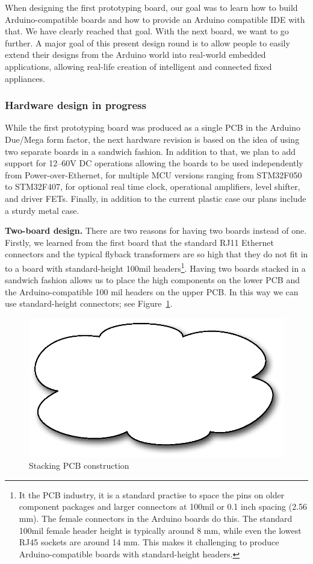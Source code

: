 \documentclass[draft,a4paper]{siamltex}
\begin{document}
When designing the first prototyping board, our goal was to learn how
to build Arduino-compatible boards and how to provide an Arduino
compatible IDE with that.  We have clearly reached that goal.  With
the next board, we want to go further.  A major goal of this present
design round is to allow people to easily extend their designs from
the Arduino world into real-world embedded applications, allowing
real-life creation of intelligent and connected fixed appliances.

\subsubsection{Hardware design in progress}

While the first prototyping board was produced as a single PCB in the
Arduino Due/Mega form factor, the next hardware revision is based on
the idea of using two separate boards in a sandwich fashion.  In
addition to that, we plan to add support for 12--60V DC operations allowing
the boards to be used independently from Power-over-Ethernet, for
multiple MCU versions ranging from STM32F050 to STM32F407, for
optional real time clock, operational amplifiers, level shifter, and
driver FETs.  Finally, in addition to the current plastic case our
plans include a sturdy metal case.

{\bf Two-board design.}
There are two reasons for having two boards instead of one.  Firstly,
we learned from the first board that the standard RJ11 Ethernet
connectors and the typical flyback transformers are so high that they
do not fit in to a board with standard-height 100mil
headers\footnote{It the PCB industry, it is a standard practise to
  space the pins on older component packages and larger connectors at
  100mil or 0.1 inch spacing (2.56 mm).  The female connectors in the Arduino
  boards do this.  The standard 100mil female header height is
  typically around 8 mm, while even the lowest RJ45 sockets
  are around 14 mm.  This makes it challenging to produce
  Arduino-compatible boards with standard-height headers.}.
Having two boards stacked in a sandwich fashion allows us to place the
high components on the lower PCB and the Arduino-compatible 100 mil
headers on the upper PCB.  In this way we can use standard-height
connectors; see Figure~\ref{fig:stacking}.

\begin{figure}
\centering
\includegraphics[scale=.4]{figure-stacking.eps}
\caption{Stacking PCB construction}
\label{fig:stacking}
\end{figure}
\end{document}
